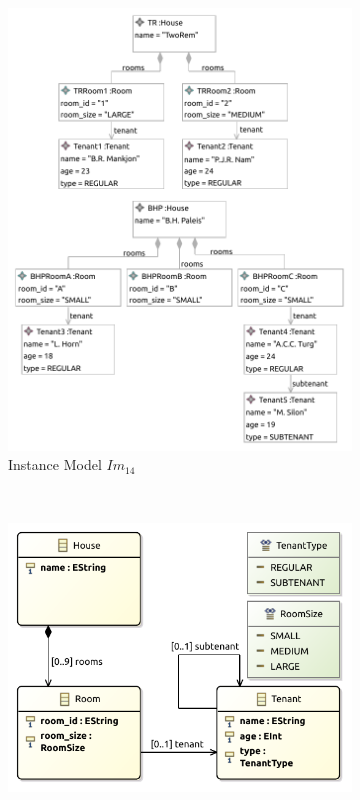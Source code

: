\begin{figure}[p]
    \centering
    \begin{subfigure}{0.98\textwidth}
        \centering
        \includegraphics{images/06_application/instance_model/step14.pdf}
        \caption{Instance Model $Im_{14}$}
        \label{fig:application:building_the_model:tenant_subtenant_relationship:ecore:instance_model}
    \end{subfigure}
    \\
    \begin{subfigure}{0.98\textwidth}
        \centering
        \includegraphics{images/06_application/type_model/step14.pdf}

\end{subfigure}
\end{figure}
